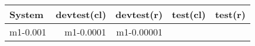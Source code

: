 \begin{tabular}{lrrrr}
	\toprule
	System & devtest(cl) & devtest(r) & test(cl) & test(r) \\
	\toprule
	m1-0.001 & 
	m1-0.0001 &
	m1-0.00001 &

\end{tabular}
